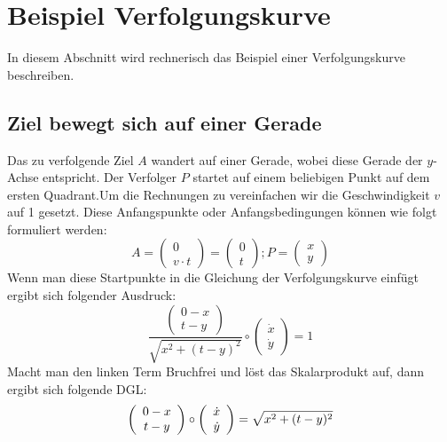 %
%
%
\section{Beispiel Verfolgungskurve
\label{lambertw:section:teil4}}
In diesem Abschnitt wird rechnerisch das Beispiel einer Verfolgungskurve beschreiben.

\subsection{Ziel bewegt sich auf einer Gerade
\label{lambertw:subsection:malorum}}
Das zu verfolgende Ziel \(A\) wandert auf einer Gerade, wobei diese Gerade der \(y\)-Achse entspricht. Der Verfolger \(P\) startet auf einem beliebigen Punkt auf dem ersten Quadrant.Um die Rechnungen zu vereinfachen wir die Geschwindigkeit \(v\) auf 1 gesetzt. Diese Anfangspunkte oder Anfangsbedingungen können wie folgt formuliert werden:
\begin{equation}
	A
	=
	\left( \begin{array}{c} 0 \\ v \cdot t \end{array} \right)
	=
	\left( \begin{array}{c} 0 \\ t \end{array} \right)
	;
	P
	=
	\left( \begin{array}{c} x \\ y \end{array} \right)
	\label{lambertw:Anfangspunkte}
\end{equation}
Wenn man diese Startpunkte in die Gleichung der Verfolgungskurve einfügt ergibt sich folgender Ausdruck:
\begin{equation}
	\frac{\left( \begin{array}{c} 0-x \\ t-y \end{array} \right)}{\sqrt{x^2 + (t-y)^2}}
	\circ
	\left(\begin{array}{c} \dot{x} \\ \dot{y} \end{array}\right)
	=
	1
	\label{lambertw:eqMitAnfangspunkte}
\end{equation}
Macht man den linken Term Bruchfrei und löst das Skalarprodukt auf, dann ergibt sich folgende DGL:
\[
	\left( \begin{array}{c} 0-x \\ t-y \end{array} \right)
	\circ
	\left(\begin{array}{c} \dot{x} \\ \dot{y} \end{array}\right)
	= \sqrt{x^2 + (t-y)^2}\\
\]
